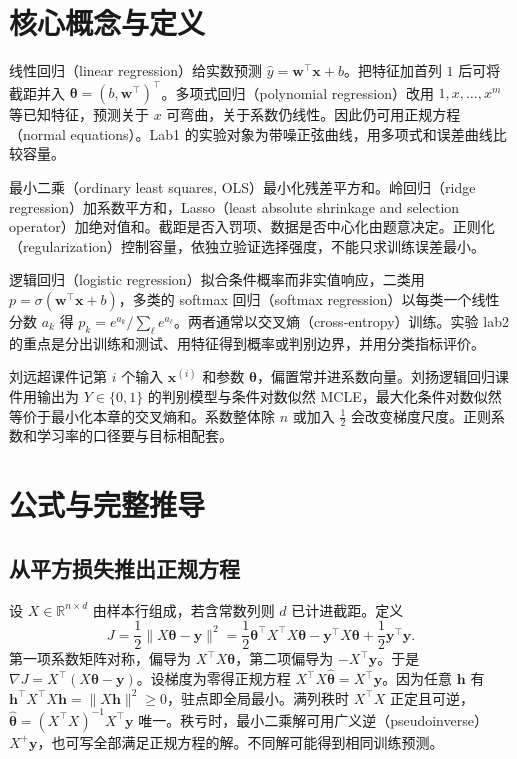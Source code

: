 \documentclass[UTF8,a4paper,zihao=-4,fontset=fandol]{ctexrep}
\begin{document}
\section{核心概念与定义}
\begin{description}[leftmargin=2em,style=nextline]
\item[输出与参数] 线性回归（linear regression）给实数预测 \(\hat y=\bm w^\top\bm x+b\)。把特征加首列 \(1\) 后可将截距并入 \(\bm\theta=(b,\bm w^\top)^\top\)。多项式回归（polynomial regression）改用 \(1,x,\ldots,x^m\) 等已知特征，预测关于 \(x\) 可弯曲，关于系数仍线性。因此仍可用正规方程（normal equations）。Lab1 的实验对象为带噪正弦曲线，用多项式和误差曲线比较容量。
\item[损失与正则] 最小二乘（ordinary least squares, OLS）最小化残差平方和。岭回归（ridge regression）加系数平方和，Lasso（least absolute shrinkage and selection operator）加绝对值和。截距是否入罚项、数据是否中心化由题意决定。正则化（regularization）控制容量，依独立验证选择强度，不能只求训练误差最小。
\item[二类与多类分类] 逻辑回归（logistic regression）拟合条件概率而非实值响应，二类用 \(p=\sigma(\bm w^\top\bm x+b)\)，多类的 softmax 回归（softmax regression）以每类一个线性分数 \(a_k\) 得 \(p_k=e^{a_k}/\sum_\ell e^{a_\ell}\)。两者通常以交叉熵（cross-entropy）训练。实验 lab2 的重点是分出训练和测试、用特征得到概率或判别边界，并用分类指标评价。
\item[老师的符号对应] 刘远超课件记第 \(i\) 个输入 \(\bm x^{(i)}\) 和参数 \(\bm\theta\)，偏置常并进系数向量。刘扬逻辑回归课件用输出为 \(Y\in\{0,1\}\) 的判别模型与条件对数似然 MCLE，最大化条件对数似然等价于最小化本章的交叉熵和。系数整体除 \(n\) 或加入 \(\tfrac12\) 会改变梯度尺度。正则系数和学习率的口径要与目标相配套。
\end{description}

\section{公式与完整推导}
\subsection*{从平方损失推出正规方程}
设 \(X\in\mathbb R^{n\times d}\) 由样本行组成，若含常数列则 \(d\) 已计进截距。定义
\[
 J=\frac12\|X\bm\theta-\bm y\|^2
 =\frac12\bm\theta^\top X^\top X\bm\theta-\bm y^\top X\bm\theta
   +\frac12\bm y^\top\bm y .
\]
第一项系数矩阵对称，偏导为 \(X^\top X\bm\theta\)，第二项偏导为 \(-X^\top\bm y\)。于是 \(\nabla J=X^\top(X\bm\theta-\bm y)\)。设梯度为零得正规方程 \(X^\top X\hat{\bm\theta}=X^\top\bm y\)。因为任意 \(\bm h\) 有 \(\bm h^\top X^\top X\bm h=\|X\bm h\|^2\ge0\)，驻点即全局最小。满列秩时 \(X^\top X\) 正定且可逆，\(\hat{\bm\theta}=(X^\top X)^{-1}X^\top\bm y\) 唯一。秩亏时，最小二乘解可用广义逆（pseudoinverse）\(X^+\bm y\)，也可写全部满足正规方程的解。不同解可能得到相同训练预测。
 
\end{document}
